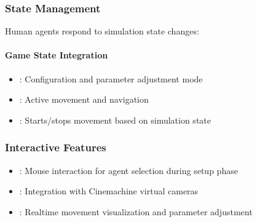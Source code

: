 \documentclass[letterpaper,10pt,english]{jupyterBook}
\begin{document}
\subsubsection{State Management}
\label{\detokenize{Human Agent:state-management}}
\sphinxAtStartPar
Human agents respond to simulation state changes:


\paragraph{Game State Integration}
\label{\detokenize{Human Agent:game-state-integration}}
\begin{sphinxVerbatim}[commandchars=\\\{\}]
\end{sphinxVerbatim}

\sphinxAtStartPar
{}
\begin{itemize}
\item {} 
\sphinxAtStartPar
{}: Configuration and parameter adjustment mode

\item {} 
\sphinxAtStartPar
{}: Active movement and navigation

\item {} 
\sphinxAtStartPar
{}: Starts/stops movement based on simulation state

\end{itemize}


\subsubsection{Interactive Features}
\label{\detokenize{Human Agent:interactive-features}}\begin{itemize}
\item {} 
\sphinxAtStartPar
{}: Mouse interaction for agent selection during setup phase

\item {} 
\sphinxAtStartPar
{}: Integration with Cinemachine virtual cameras

\item {} 
\sphinxAtStartPar
{}: Real\sphinxhyphen{}time movement visualization and parameter adjustment

\end{itemize}
\end{document}
